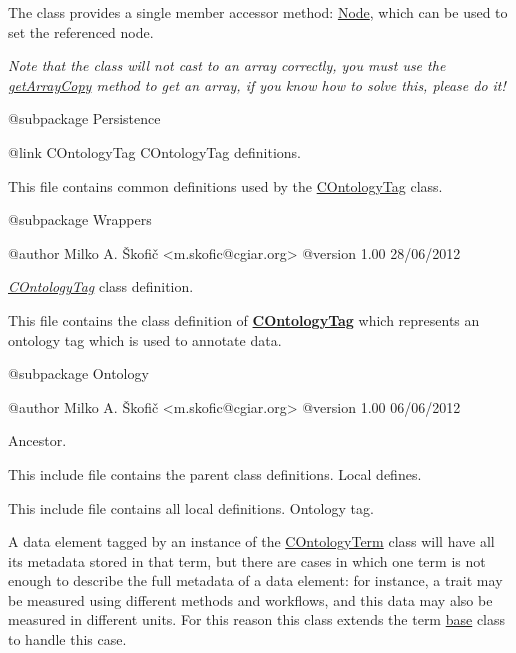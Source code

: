 The class provides a single member accessor method\-: \hyperlink{}{Node}, which can be used to set the referenced node.

{\itshape Note that the class will not cast to an array correctly, you must use the \hyperlink{}{get\-Array\-Copy} method to get an array, if you know how to solve this, please do it!}

\begin{DoxyVerb} @subpackage        Persistence\end{DoxyVerb}


\begin{DoxyVerb} {@link COntologyTag COntologyTag} definitions.
\end{DoxyVerb}


This file contains common definitions used by the \hyperlink{class_c_ontology_tag}{C\-Ontology\-Tag} class.

\begin{DoxyVerb} @subpackage        Wrappers

 @author            Milko A. Škofič <m.skofic@cgiar.org>
 @version   1.00 28/06/2012\end{DoxyVerb}


{\itshape \hyperlink{class_c_ontology_tag}{C\-Ontology\-Tag}} class definition.

This file contains the class definition of {\bfseries \hyperlink{class_c_ontology_tag}{C\-Ontology\-Tag}} which represents an ontology tag which is used to annotate data.

\begin{DoxyVerb} @subpackage        Ontology

 @author            Milko A. Škofič <m.skofic@cgiar.org>
 @version   1.00 06/06/2012\end{DoxyVerb}


Ancestor.

This include file contains the parent class definitions. Local defines.

This include file contains all local definitions. Ontology tag.

A data element tagged by an instance of the \hyperlink{class_c_ontology_term}{C\-Ontology\-Term} class will have all its metadata stored in that term, but there are cases in which one term is not enough to describe the full metadata of a data element\-: for instance, a trait may be measured using different methods and workflows, and this data may also be measured in different units. For this reason this class extends the term \hyperlink{class_c_ontology_term_object}{base} class to handle this case.

